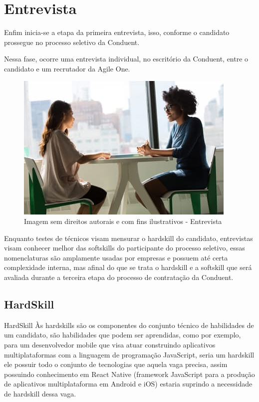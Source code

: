 \documentclass[12pt]{article}
\begin{document}
\maketitle

\section{Entrevista}
Enfim inicia-se a etapa da primeira entrevista, isso, conforme o candidato prossegue no processo seletivo da Conduent. 

Nessa fase, ocorre uma entrevista individual, no escritório da Conduent, entre o candidato e um recrutador da Agile One.

\begin{figure}[h]
	\centering
	\includegraphics[scale=0.5]{interview}
	\caption{Imagem sem direitos autorais e com fins ilustrativos - Entrevista}
	\label{fig:mesh1}
\end{figure}
Enquanto testes de técnicos visam mensurar o hardskill do candidato, entrevistas visam conhecer melhor das softskills do participante do processo seletivo, essas nomenclaturas são amplamente usadas por empresas e possuem até certa complexidade interna, mas afinal do que se trata o hardskill e a softskill que será avaliada durante a terceira etapa do processo de contratação da Conduent.

\subsection{HardSkill}
HardSkill
Às hardskills são os componentes do conjunto técnico de habilidades de um candidato, são habilidades que podem ser aprendidas, como por exemplo, para um desenvolvedor mobile que visa atuar construindo aplicativos multiplataformas com a linguagem de programação JavaScript, seria um hardskill ele possuir todo o conjunto de tecnologias que aquela vaga precisa, assim possuindo conhecimento em React Native (framework JavaScript para a produção de aplicativos multiplataforma em Android e iOS) estaria suprindo a necessidade de hardskill dessa vaga. 
\end{document}

